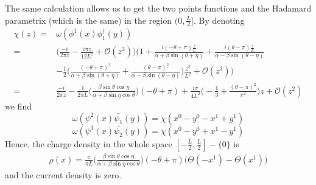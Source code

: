 The same calculation allows us to get the two points functions and the Hadamard parametrix (which is the same) in the region $(0, \frac{L}{2}]$. By denoting
\begin{equation*}
\begin{split} 
\chi(z) = & \omega(\phi^1(x) \phi^\dagger_1(y)) \\
= & \Big(  \frac{-i}{2 \pi z} - \frac{i \pi z}{12L^2} + \mathcal{O}(z^3) \Big)  \bigg( 1 + \frac{i(-\theta + \pi)\frac{z}{L}}{\alpha + \beta\sin(\theta + \eta)}  
+ \frac{ i (\theta - \pi) \frac{z}{L}}{\alpha - \beta\sin(\theta - \eta)}   \\
& - \frac{1}{2}\Big(\frac{(-\theta + \pi)^2}{\alpha + \beta \sin (\theta + \eta)}  
+ \frac{(\theta - \pi)^2}{\alpha - \beta \sin (\theta - \eta)} \Big)\frac{z^2}{L^2}
+ \mathcal{O}(z^3) \bigg)  \\
= & \frac{-i}{2 \pi z} - \frac{1}{2\pi L} \Big( \frac{\beta \sin \theta \cos \eta}{\alpha + \beta \sin \eta \cos \theta}\Big) (-\theta + \pi) 
+ \frac{i\pi}{4 L^2}\big( -\frac{1}{3} + \frac{(\theta - \pi)^2}{\pi^2}\big)z
+ \mathcal{O}(z^2)
\end{split}
\end{equation*}
we find
\begin{equation*}
\omega(\psi^2(x) \bar{\psi_1}(y)) = \chi(x^0 - y^0 - x^1 + y^1)
\end{equation*}
\begin{equation*}
\omega(\psi^1(x) \bar{\psi_2}(y)) = \chi(x^0 - y^0 + x^1 - y^1)
\end{equation*}
Hence, the charge density in the whole space $[-\frac{L}{2}, \frac{L}{2}] - \{0\}$ is
\begin{equation}
\begin{split}
\rho(x) = \frac{e}{\pi L}\Big( \frac{\beta \sin \theta \cos \eta}{\alpha + \beta \sin \eta \cos \theta}\Big) (-\theta + \pi) \Big( \Theta(-x^1) - \Theta(x^1)\Big)
\end{split}
\end{equation}
and the current density is zero. 
